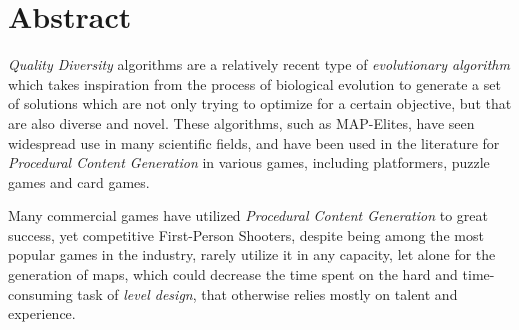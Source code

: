 \documentclass{Configuration_Files/PoliMi3i_thesis}
\begin{document}

\pagestyle{empty} %
\frontmatter %


\startpreamble
\setcounter{page}{1} %

\chapter*{Abstract} 
\textit{Quality Diversity} algorithms are a relatively recent type of \textit{evolutionary algorithm} which takes inspiration from the process of biological evolution to generate a set of solutions which are not only trying to optimize for a certain objective, but that are also diverse and novel. These algorithms, such as MAP-Elites, have seen widespread use in many scientific fields, and have been used in the literature for \textit{Procedural Content Generation} in various games, including platformers, puzzle games and card games.

Many commercial games have utilized \textit{Procedural Content Generation} to great success, yet competitive First-Person Shooters, despite being among the most popular games in the industry, rarely utilize it in any capacity, let alone for the generation of maps, which could decrease the time spent on the hard and time-consuming task of \textit{level design}, that otherwise relies mostly on talent and experience.
\end{document}
